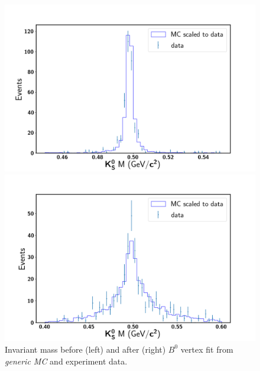 \begin{figure}[htbp]
\begin{minipage}[b]{0.5\linewidth}
	\centering 
	\includegraphics[width=1\linewidth]{figures/best_KsM}	
\end{minipage}
\begin{minipage}[b]{0.5\linewidth}
	\centering 
	\includegraphics[width=1\linewidth]{figures/best_KsInvM}	
\end{minipage}
\caption{Invariant mass before (left) and after (right) $B^0$ vertex fit from \textit{generic MC} and experiment data.}
\label{fig:b0ksmass}
\end{figure}

